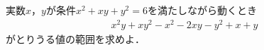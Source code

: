 \documentclass[../../main.tex]{subfiles}
\begin{document}
実数$x$，$y$が条件$x^2+xy+y^2=6$を満たしながら動くとき
\begin{align*}
  x^2y+xy^2-x^2-2xy-y^2+x+y
\end{align*}
がとりうる値の範囲を求めよ．
\end{document}
